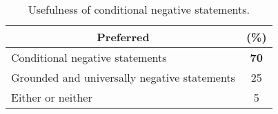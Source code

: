 \begin{table}
  \caption{Usefulness of conditional negative statements.}
  \centering
  \label{tab:conditionaluse}
  \begin{tabular}{l|l}
    \toprule
        \multicolumn{1}{c}{\textbf{Preferred}} & 
        \multicolumn{1}{c}{\textbf{(\%)}}\\
            \midrule
    \multicolumn{1}{l}{Conditional negative statements} & \multicolumn{1}{c}{\textbf{70}}\\
    \multicolumn{1}{l}{Grounded and universally negative statements} & \multicolumn{1}{c}{25}\\
    \multicolumn{1}{l}{Either or neither} & \multicolumn{1}{c}{5}\\
    \bottomrule
  \end{tabular}
\end{table}

\begin{table*}
  \caption{Top-3 negative statements about \textit{Leonardo Dicaprio}, before and after lifting.}
  \label{tab:leolifting}
  \centering
  \end{table*}










